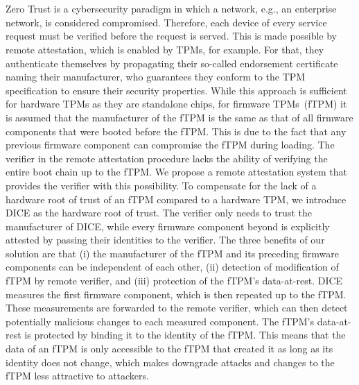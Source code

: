 \chapter{\abstractname}

Zero Trust is a cybersecurity paradigm in which a network, e.g., an enterprise network, is considered compromised.
Therefore, each device of every service request must be verified before the request is served.
This is made possible by remote attestation, which is enabled by TPMs, for example.
For that, they authenticate themselves by propagating their so-called endorsement certificate naming their manufacturer, who guarantees they conform to the TPM specification to ensure their security properties.
While this approach is sufficient for hardware TPMs as they are standalone chips, for firmware TPMs~(fTPM) it is assumed that the manufacturer of the fTPM is the same as that of all firmware components that were booted before the fTPM\@.
This is due to the fact that any previous firmware component can compromise the fTPM during loading.
The verifier in the remote attestation procedure lacks the ability of verifying the entire boot chain up to the fTPM\@.
We propose a remote attestation system that provides the verifier with this possibility.
To compensate for the lack of a hardware root of trust of an fTPM compared to a hardware TPM, we introduce DICE as the hardware root of trust.
The verifier only needs to trust the manufacturer of DICE, while every firmware component beyond is explicitly attested by passing their identities to the verifier.
The three benefits of our solution are that (i) the manufacturer of the fTPM and its preceding firmware components can be independent of each other, (ii) detection of modification of fTPM by remote verifier, and (iii) protection of the fTPM's data-at-rest.
DICE measures the first firmware component, which is then repeated up to the fTPM\@.
These measurements are forwarded to the remote verifier, which can then detect potentially malicious changes to each measured component.
The fTPM's data-at-rest is protected by binding it to the identity of the fTPM\@.
This means that the data of an fTPM is only accessible to the fTPM that created it as long as its identity does not change, which makes downgrade attacks and changes to the fTPM less attractive to attackers.
